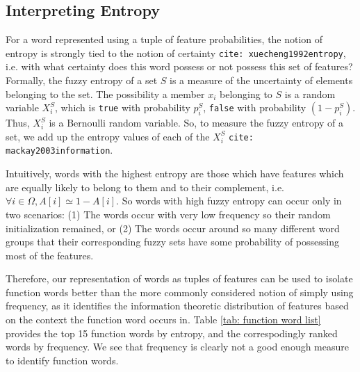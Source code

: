 \documentclass[11pt]{book}
\newcommand{\citep}[1]{\texttt{cite: #1}}
\begin{document}
\subsection{Interpreting Entropy} \label{ssec: entropy math} For a word
represented using a tuple of feature probabilities, the notion of entropy is
strongly tied to the notion of certainty \citep{xuecheng1992entropy}, i.e. with
what certainty does this word possess or not possess this set of features?
Formally, the fuzzy entropy of a set $S$ is a measure of the uncertainty of
elements belonging to the set. The possibility a member $x_i$ belonging to $S$
is a random variable $X^S_i$, which is \texttt{true} with probability $p^S_i$,
\texttt{false} with probability $(1 - p^S_i)$. Thus, $X^S_i$ is a Bernoulli
random variable. So, to measure the fuzzy entropy of a set, we add up the
entropy values of each of the $X^S_i$ \citep{mackay2003information}. 

Intuitively, words with the highest entropy are those which have features which
are equally likely to belong to them and to their complement, i.e. $\forall i
\in \Omega, A[i] \simeq 1 - A[i]$. So words with high fuzzy entropy can occur
only in two scenarios: (1) The words occur with very low frequency so their
random initialization remained, or (2) The words occur around so many different
word groups that their corresponding fuzzy sets have some probability of
possessing most of the features.

Therefore, our representation of words as tuples of features can be used to
isolate function words better than the more commonly considered notion of
simply using frequency, as it identifies the information theoretic distribution
of features based on the context the function word occurs in. Table \ref{tab:
function word list} provides the top 15 function words by entropy, and the
correspodingly ranked words by frequency. We see that frequency is clearly not
a good enough measure to identify function words. 

\end{document}
